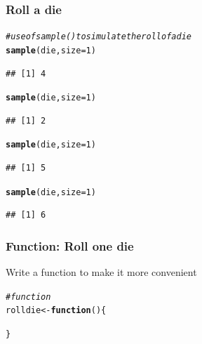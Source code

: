 \documentclass[12pt]{beamer}\usepackage[]{graphicx}\usepackage[]{color}
\makeatletter
\newcommand{\hlnum}[1]{\textcolor[rgb]{0.686,0.059,0.569}{#1}}%
\newcommand{\hlcom}[1]{\textcolor[rgb]{0.678,0.584,0.686}{\textit{#1}}}%
\newcommand{\hlstd}[1]{\textcolor[rgb]{0.345,0.345,0.345}{#1}}%
\newcommand{\hlkwa}[1]{\textcolor[rgb]{0.161,0.373,0.58}{\textbf{#1}}}%
\newcommand{\hlkwb}[1]{\textcolor[rgb]{0.69,0.353,0.396}{#1}}%
\newcommand{\hlkwc}[1]{\textcolor[rgb]{0.333,0.667,0.333}{#1}}%
\newcommand{\hlkwd}[1]{\textcolor[rgb]{0.737,0.353,0.396}{\textbf{#1}}}%
\newenvironment{kframe}{%
 \def\at@end@of@kframe{}%
 \ifinner\ifhmode%
  \def\at@end@of@kframe{\end{minipage}}%
  \begin{minipage}{\columnwidth}%
 \fi\fi%
 \def\FrameCommand##1{\hskip\@totalleftmargin \hskip-\fboxsep
 \colorbox{shadecolor}{##1}\hskip-\fboxsep
     \hskip-\linewidth \hskip-\@totalleftmargin \hskip\columnwidth}%
 \MakeFramed {\advance\hsize-\width
   \@totalleftmargin\z@ \linewidth\hsize
   \@setminipage}}%
 {\par\unskip\endMakeFramed%
 \at@end@of@kframe}
\newenvironment{knitrout}{}{} %
\makeatother
\begin{document}

\begin{frame}[fragile]
\frametitle{Roll a die}

\begin{knitrout}\footnotesize
{}\color{fgcolor}\begin{kframe}
\begin{alltt}
\hlcom{# use of sample() to simulate the roll of a die}
\hlkwd{sample}\hlstd{(die,} \hlkwc{size} \hlstd{=} \hlnum{1}\hlstd{)}
\end{alltt}
\begin{verbatim}
## [1] 4
\end{verbatim}
\end{kframe}
\end{knitrout}

\pause
\begin{knitrout}\footnotesize
{}\color{fgcolor}\begin{kframe}
\begin{alltt}
\hlkwd{sample}\hlstd{(die,} \hlkwc{size} \hlstd{=} \hlnum{1}\hlstd{)}
\end{alltt}
\begin{verbatim}
## [1] 2
\end{verbatim}
\begin{alltt}
\hlkwd{sample}\hlstd{(die,} \hlkwc{size} \hlstd{=} \hlnum{1}\hlstd{)}
\end{alltt}
\begin{verbatim}
## [1] 5
\end{verbatim}
\begin{alltt}
\hlkwd{sample}\hlstd{(die,} \hlkwc{size} \hlstd{=} \hlnum{1}\hlstd{)}
\end{alltt}
\begin{verbatim}
## [1] 6
\end{verbatim}
\end{kframe}
\end{knitrout}

\end{frame}


\begin{frame}[fragile]
\frametitle{Function: Roll one die}

Write a function to make it more convenient
\begin{knitrout}\footnotesize
{}\color{fgcolor}\begin{kframe}
\begin{alltt}
\hlcom{# function}
\hlstd{rolldie} \hlkwb{<-} \hlkwa{function}\hlstd{() \{}


\hlstd{\}}
\end{alltt}
\end{kframe}
\end{knitrout}

\end{frame}
\end{document}
